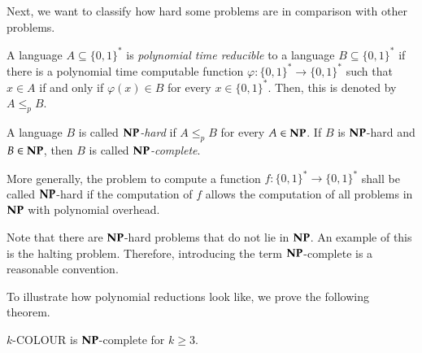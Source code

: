 Next, we want to classify how hard some problems are in comparison with other problems.

\begin{Definition}
 A language $A \subseteq {\lbrace 0,1 \rbrace}^*$ is \emph{polynomial time reducible} to a language 
 $B \subseteq {\lbrace 0,1 \rbrace}^*$ if there is a polynomial time computable function 
 ${\varphi \colon {\lbrace 0,1 \rbrace}^* \to {\lbrace 0,1 \rbrace}^*}$ such that $x \in A$ if and only if $\varphi (x) \in B$
 for every $x \in {\lbrace 0,1 \rbrace}^*$. Then, this is denoted by $ A \leq_p B$. 
 
 A language $B$ is called \emph{$\mathbf{NP}$-hard} if $A \leq_p B$ for every $A \in \mathbf{NP}$. If $B$ is $\mathbf{NP}$-hard
 and $B \in \mathbf{NP}$, then $B$ is called \emph{$\mathbf{NP}$-complete}.
\end{Definition}

\begin{Remark}
 More generally, the problem to compute a function $f \colon {\lbrace 0,1 \rbrace}^* \to {\lbrace 0,1 \rbrace}^*$ shall be called
 $\mathbf{NP}$-hard if the computation of $f$ allows the computation of all problems in $\mathbf{NP}$ with polynomial overhead.
\end{Remark}

\begin{Remark}
 Note that there are $\mathbf{NP}$-hard problems that do not lie in $\mathbf{NP}$. 
 An example of this is the halting problem.
 Therefore, introducing the term $\mathbf{NP}$-complete is a reasonable convention.
\end{Remark}


To illustrate how polynomial reductions look like, we prove the following theorem.

\begin{Theorem}
  $k$-COLOUR is $\mathbf{NP}$-complete for $k \geq 3$.
\end{Theorem}

